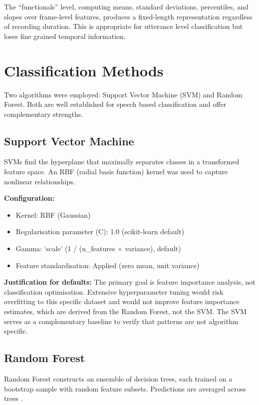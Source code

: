 The ``functionals'' level, computing means, standard deviations, percentiles, and slopes over frame-level features, produces a fixed-length representation regardless of recording duration. This is appropriate for utterance level classification but loses fine grained temporal information.

\section{Classification Methods}

Two algorithms were employed: Support Vector Machine (SVM) and Random Forest. Both are well established for speech based classification and offer complementary strengths.

\subsection{Support Vector Machine}

SVMs find the hyperplane that maximally separates classes in a transformed feature space. An RBF (radial basis function) kernel was used to capture nonlinear relationships.

\textbf{Configuration:}
\begin{itemize}
    \item Kernel: RBF (Gaussian)
    \item Regularisation parameter (C): 1.0 (scikit-learn default)
    \item Gamma: `scale' (1 / (n\_features $\times$ variance), default)
    \item Feature standardisation: Applied (zero mean, unit variance)
\end{itemize}

\textbf{Justification for defaults:} The primary goal is feature importance analysis, not classification optimisation. Extensive hyperparameter tuning would risk overfitting to this specific dataset and would not improve feature importance estimates, which are derived from the Random Forest, not the SVM. The SVM serves as a complementary baseline to verify that patterns are not algorithm specific.

\subsection{Random Forest}

Random Forest constructs an ensemble of decision trees, each trained on a bootstrap sample with random feature subsets. Predictions are averaged across trees \cite{Breiman2001}.

